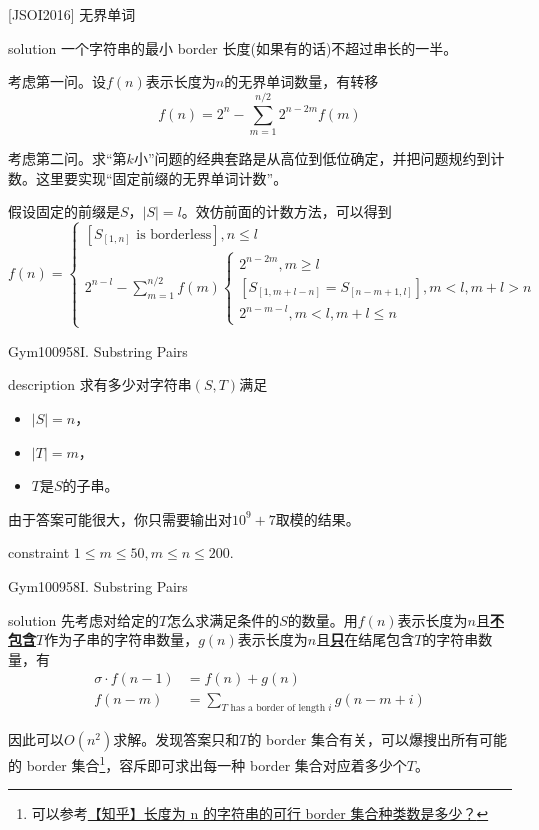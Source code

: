 \documentclass{beamer}
\theoremstyle{compact}
\def\obj#1{\textbf{\uline{#1}}}
\def\le{\leqslant}
\def\ge{\geqslant}
\begin{document}
\begin{frame}{[JSOI2016] 无界单词}
	\begin{block}{solution}
		一个字符串的最小 border 长度(如果有的话)不超过串长的一半。\pause

		考虑第一问。设$f(n)$表示长度为$n$的无界单词数量，有转移
		$$f(n) = 2^n - \sum_{m=1}^{n/2}2^{n-2m}f(m)$$\pause

		考虑第二问。求“第$k$小”问题的经典套路是从高位到低位确定，并把问题规约到计数。这里要实现“固定前缀的无界单词计数”。

		假设固定的前缀是$S$，$|S| = l$。效仿前面的计数方法，可以得到
		$$f(n) = \begin{cases}
			[S_{[1, n]} \textrm{ is borderless}], n \le l\\
			2^{n-l} - \sum\limits_{m=1}^{n/2}f(m)\begin{cases}
				2^{n-2m},  m \ge l\\
				[S_{[1, m+l-n]} = S_{[n-m+1, l]}],  m < l, m +l > n\\
				2^{n-m-l},  m < l, m + l \le n 
			\end{cases}
		\end{cases}$$
	\end{block}
\end{frame}
\begin{frame}{Gym100958I. Substring Pairs}
	\begin{block}{description}
		求有多少对字符串$(S, T)$满足
		\begin{itemize}
			\item $|S| = n$，
			\item $|T| = m$，
			\item $T$是$S$的子串。
		\end{itemize}

		由于答案可能很大，你只需要输出对$10^9 + 7$取模的结果。
	\end{block}
	\begin{block}{constraint}
		$1 \le m \le 50, m \le n \le 200.$
	\end{block}
\end{frame}
\begin{frame}{Gym100958I. Substring Pairs}
	\begin{block}{solution}
		先考虑对给定的$T$怎么求满足条件的$S$的数量。用$f(n)$表示长度为$n$且\obj{不包含}$T$作为子串的字符串数量，$g(n)$表示长度为$n$且\obj{只}在结尾包含$T$的字符串数量，有
		\begin{align*}
			\sigma \cdot f(n - 1) &= f(n) + g(n)\\
			f(n - m) &= \sum_{T \textrm{ has a border of length } i} g(n - m + i)
		\end{align*}

		因此可以$O(n^2)$求解。\pause 发现答案只和$T$的 border 集合有关，可以爆搜出所有可能的 border 集合\footnote{\tiny 可以参考\href{https://www.zhihu.com/question/287342987}{【知乎】长度为 n 的字符串的可行 border 集合种类数是多少？}}，容斥即可求出每一种 border 集合对应着多少个$T$。
	\end{block}
\end{frame}
\end{document}
